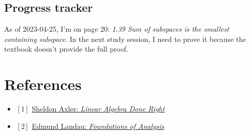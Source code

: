 \documentclass[12pt, letterpaper, oneside]{book}
\begin{document}
\section{Progress tracker}

As of 2023-04-25, I'm on page 20: \textit{1.39 Sum of subspaces is the smallest
containing subspace}. In the next study session, I need to prove it because the
textbook doesn't provide the full proof.

\chapter*{References}

\begin{itemize}
  \item $[1]$ \href{https://linear.axler.net/}{Sheldon Axler: \it{Linear Algebra Done Right}}
  \item $[2]$ \href{https://bookstore.ams.org/view?ProductCode=CHEL/79}{Edmund Landau: \it{Foundations of Analysis}}
\end{itemize}
\end{document}
